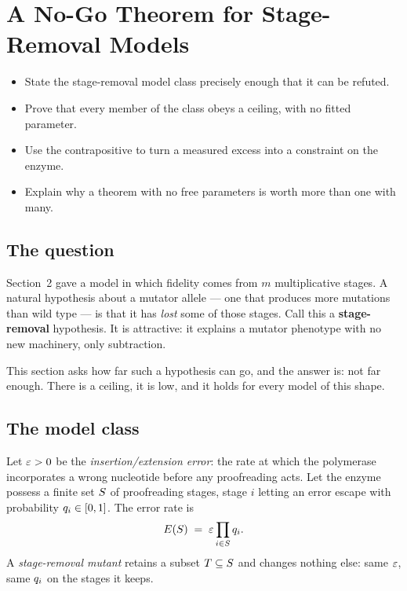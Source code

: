 \section{A No-Go Theorem for Stage-Removal Models}\label{sec:nogo}

\begin{objectives}
\begin{itemize}[leftmargin=*,itemsep=1pt,topsep=1pt]
  \item State the stage-removal model class precisely enough that it can be refuted.
  \item Prove that every member of the class obeys a ceiling, with no fitted parameter.
  \item Use the contrapositive to turn a measured excess into a constraint on the enzyme.
  \item Explain why a theorem with no free parameters is worth more than one with many.
\end{itemize}
\end{objectives}

\subsection{The question}

Section~2 gave a model in which fidelity comes from $m$ multiplicative stages.
A natural hypothesis about a mutator allele --- one that produces more mutations
than wild type --- is that it has \emph{lost} some of those stages. Call this a
\textbf{stage-removal} hypothesis. It is attractive: it explains a mutator
phenotype with no new machinery, only subtraction.

This section asks how far such a hypothesis can go, and the answer is: not far
enough. There is a ceiling, it is low, and it holds for every model of this shape.

\subsection{The model class}

\begin{model}\label{model:class}
Let $\varepsilon > 0$ be the \emph{insertion/extension error}: the rate at which the
polymerase incorporates a wrong nucleotide before any proofreading acts. Let the
enzyme possess a finite set $S$ of proofreading stages, stage $i$ letting an
error escape with probability $q_i \in [0,1]$. The error rate is
\begin{equation}\label{eq:errorrate}
  E(S) \;=\; \varepsilon \prod_{i \in S} q_i .
\end{equation}
A \emph{stage-removal mutant} retains a subset $T \subseteq S$ and changes
nothing else: same $\varepsilon$, same $q_i$ on the stages it keeps.
\end{model}

